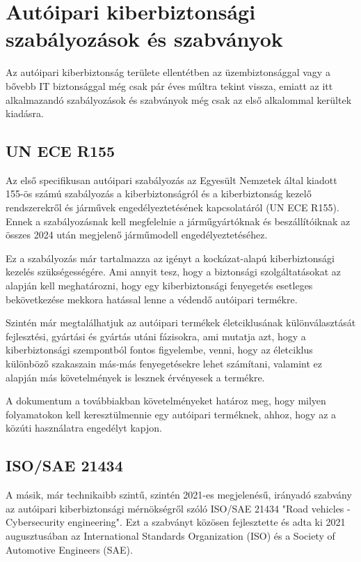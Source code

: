 \section{Autóipari kiberbiztonsági szabályozások és szabványok}

Az autóipari kiberbiztonság területe ellentétben az üzembiztonsággal vagy a bővebb IT biztonsággal még csak pár éves múltra tekint vissza, emiatt az itt alkalmazandó szabályozások és szabványok még csak az első alkalommal kerültek kiadásra. 

\subsection{UN ECE R155}
Az első specifikusan autóipari szabályozás az Egyesült Nemzetek által kiadott 155-ös számú szabályozás a kiberbiztonságról és a kiberbiztonság kezelő rendszerekről és járművek engedélyeztetésének kapcsolatáról (UN ECE R155\cite{R155}). Ennek a szabályozásnak kell megfelelnie a járműgyártóknak és beszállítóiknak az összes 2024 után megjelenő járműmodell engedélyeztetéséhez.

Ez a szabályozás már tartalmazza az igényt a kockázat-alapú kiberbiztonsági kezelés szükségességére. Ami annyit tesz, hogy a biztonsági szolgáltatásokat az alapján kell meghatározni, hogy egy kiberbiztonsági fenyegetés esetleges bekövetkezése mekkora hatással lenne a védendő autóipari termékre.

Szintén már megtalálhatjuk az autóipari termékek életciklusának különválasztását fejlesztési, gyártási és gyártás utáni fázisokra, ami mutatja azt, hogy a kiberbiztonsági szempontból fontos figyelembe, venni, hogy az életciklus különböző szakaszain más-más fenyegetésekre lehet számítani, valamint ez alapján más követelmények is lesznek érvényesek a termékre.

A dokumentum a továbbiakban követelményeket határoz meg, hogy milyen folyamatokon kell keresztülmennie egy autóipari terméknek, ahhoz, hogy az a közúti használatra engedélyt kapjon. 

\subsection{ISO/SAE 21434}

A másik, már technikaibb szintű, szintén 2021-es megjelenésű, irányadó szabvány az autóipari kiberbiztonsági mérnökségről szóló ISO/SAE 21434 "Road vehicles - Cybersecurity engineering". Ezt a szabványt közösen fejlesztette és adta ki 2021 augusztusában az International Standards Organization (ISO) és a Society of Automotive Engineers (SAE).


